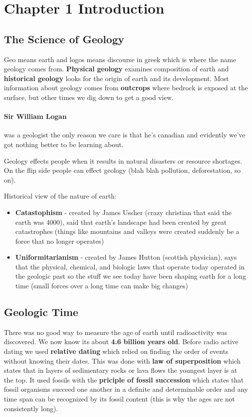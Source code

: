 \documentclass{article}
\begin{document}
\section*{Chapter 1 Introduction} %
\label{sec:chapter_1}
\subsection*{The Science of Geology} %
\label{sub:the_science_of_geology}
Geo means earth and logos means discourse in greek which is where the name geology comes from. \textbf{Physical geology} examines composition of earth and \textbf{historical geology} looks for the origin of earth and its development. Most information about geology comes from \textbf{outcrops} where bedrock is exposed at the surface, but other times we dig down to get a good view.

\paragraph{Sir William Logan} was a geologist the only reason we care is that he's canadian and evidently we've got nothing better to be learning about.

Geology effects people when it results in natural disasters or resource shortages. On the flip side people can effect geology (blah blah pollution, deforestation, so on).

Historical view of the nature of earth:
\begin{itemize}
    \item \textbf{Catastophism} - created by James Ussher (crazy christian that said the earth was 4000), said that earth's landscape had been created by great catastrophes (things like mountains and valleys were created suddenly be a force that no longer operates)
    \item \textbf{Uniformitarianism} - created by James Hutton (scottish physician), says that the physical, chemical, and biologic laws that operate today operated in the geologic past so the stuff we see today have been shaping earth for a long time (small forces over a long time can make big changes)
\end{itemize}

\subsection*{Geologic Time} %
\label{sub:geologic_time}
There was no good way to measure the age of earth until radioactivity was discovered. We now know its about \textbf{4.6 billion years old}. Before radio active dating we used \textbf{relative dating} which relied on finding the order of events without knowing their dates. This was done with \textbf{law of superposition} which states that in layers of sedimentary rocks or lava flows the youngest layer is at the top. It used fossils with the \textbf{priciple of fossil succession} which states that fossil organisms succeed one another in a definite and determinable order and any time span can be recognized by its fossil content (this is why the ages are not consistently long).
\end{document}
